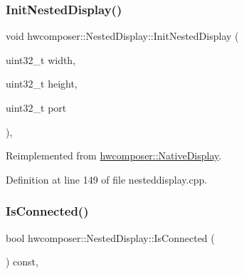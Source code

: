 \subsubsection{\texorpdfstring{Init\+Nested\+Display()}{InitNestedDisplay()}}
{\footnotesize\ttfamily void hwcomposer\+::\+Nested\+Display\+::\+Init\+Nested\+Display (\begin{DoxyParamCaption}\item[{uint32\+\_\+t}]{width,  }\item[{uint32\+\_\+t}]{height,  }\item[{uint32\+\_\+t}]{port }\end{DoxyParamCaption})\hspace{0.3cm}{\ttfamily [override]}, {\ttfamily [virtual]}}



Reimplemented from \mbox{\hyperlink{classhwcomposer_1_1NativeDisplay_abeaa73138aad163b3da6263818990ba4}{hwcomposer\+::\+Native\+Display}}.



Definition at line 149 of file nesteddisplay.\+cpp.


\begin{DoxyCode}{0}
\end{DoxyCode}
\mbox{\label{classhwcomposer_1_1NestedDisplay_a3d55a6460b227f9f9e967d0f414d0159}} 
\subsubsection{\texorpdfstring{Is\+Connected()}{IsConnected()}}
{\footnotesize\ttfamily bool hwcomposer\+::\+Nested\+Display\+::\+Is\+Connected (\begin{DoxyParamCaption}{ }\end{DoxyParamCaption}) const\hspace{0.3cm}{\ttfamily [override]}, {\ttfamily [virtual]}}

